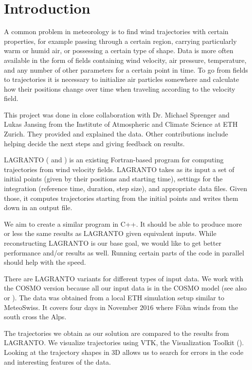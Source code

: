 \setcounter{chapter}{0}

\chapter{Introduction}

A common problem in meteorology is to find wind trajectories with certain properties, for example passing through a certain region, carrying particularly warm or humid air, or possessing a certain type of shape. Data is more often available in the form of fields containing wind velocity, air pressure, temperature, and any number of other parameters for a certain point in time. To go from fields to trajectories it is necessary to initialize air particles somewhere and calculate how their positions change over time when traveling according to the velocity field. 

This project was done in close collaboration with Dr. Michael Sprenger and Lukas Jansing from the Institute of Atmospheric and Climate Science at ETH Zurich. They provided and explained the data. Other contributions include helping decide the next steps and giving feedback on results. 

LAGRANTO (\cite{src:lagranto_v1} and \cite{src:lagranto}) is an existing Fortran-based program for computing trajectories from wind velocity fields.
LAGRANTO takes as its input a set of initial points (given by their positions and starting time), settings for the integration (reference time, duration, step size), and appropriate data files. Given those, it computes trajectories starting from the initial points and writes them down in an output file.

We aim to create a similar program in C++. It should be able to produce more or less the same results as LAGRANTO given equivalent inputs. While reconstructing LAGRANTO is our base goal, we would like to get better performance and/or results as well. Running certain parts of the code in parallel should help with the speed.

There are LAGRANTO variants for different types of input data. We work with the COSMO version because all our input data is in the COSMO model (see also \cite{src:cosmo} or \cite{src:cosmo2}). The data was obtained from a local ETH simulation setup similar to MeteoSwiss. It covers four days in November $2016$ where F\"ohn winds from the south cross the Alps.

The trajectories we obtain as our solution are compared to the results from LAGRANTO. We visualize trajectories using VTK, the Visualization Toolkit (\cite{src:vtk}). Looking at the trajectory shapes in 3D allows us to search for errors in the code and interesting features of the data. 

